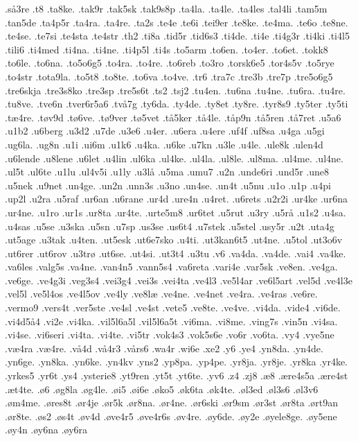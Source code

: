 {.så3re
.t8
.ta8ke.
.tak9r
.tak5sk
.tak9s8p
.ta4la.
.ta4le.
.ta4les
.tal4li
.tam5m
.tan5de
.ta4p5r
.ta4ra.
.ta4re.
.ta2s
.te4e
.te6i
.tei9er
.te8ke.
.te4ma.
.te6o
.te8ne.
.te4se.
.te7si
.te4sta
.te4str
.th2
.ti8a
.tid5r
.tid6s3
.ti4de.
.ti4e
.ti4g3r
.ti4ki
.ti4l5
.tili6
.ti4med
.ti4na.
.ti4ne.
.ti4p5l
.ti4s
.to5arm
.to6en.
.to4er.
.to6et.
.tokk8
.to6le.
.to6na.
.to5o6g5
.to4ra.
.to4re.
.to6reb
.to3ro
.torsk6e5
.tor4s5v
.to5rye
.to4str
.tota9la.
.to5t8
.to8te.
.to6va
.to4ve.
.tr6
.tra7c
.tre3b
.tre7p
.tre5o6g5
.tre6skja
.tre3s8ko
.tre3sp
.tre5s6t
.ts2
.tsj2
.tu4en.
.tu6na
.tu4ne.
.tu6ra.
.tu4re.
.tu8ve.
.tve6n
.tver6r5a6
.två7g
.ty6da.
.ty4de.
.ty8et
.ty8re.
.tyr8s9
.ty5ter
.ty5ti
.tæ4re.
.tøv9d
.tø6ve.
.tø9ver
.tø5vet
.tå5ker
.tå4le.
.tåp9n
.tå5ren
.tå7ret
.u5a6
.u1b2
.u6berg
.u3d2
.u7de
.u3e6
.u4er.
.u6era
.u4ere
.uf4f
.uf8sa
.u4ga
.u5gi
.ug6la.
.ug8n
.u1i
.ui6m
.u1k6
.u4ka.
.u6ke
.u7kn
.u3le
.u4le.
.ule8k
.ulen4d
.u6lende
.u8lene
.u6let
.u4lin
.ul6ka
.ul4ke.
.ul4la.
.ul8le.
.ul8ma.
.ul4me.
.ul4ne.
.ul5t
.ul6te
.u1lu
.ul4v5i
.u1ly
.u3lå
.u5ma
.umu7
.u2n
.unde6ri
.und5r
.une8
.u5nek
.u9net
.un4ge.
.un2n
.unn3s
.u3no
.un4se.
.un4t
.u5nu
.u1o
.u1p
.u4pi
.up2l
.u2ra
.u5raf
.ur6an
.u6rane
.ur4d
.ure4n
.u4ret.
.u6rets
.u2r2i
.ur4ke
.ur6na
.ur4ne.
.u1ro
.ur1s
.ur8ta
.ur4te.
.urte5m8
.ur6tet
.u5rut
.u3ry
.u5rå
.u1s2
.u4sa.
.u4sas
.u5se
.u3ska
.u5sn
.u7sp
.us3se
.us6t4
.u7stek
.u5stel
.usy5r
.u2t
.uta4g
.ut5age
.u3tak
.u4ten.
.ut5esk
.ut6e7sko
.u4ti.
.ut3kan6t5
.ut4ne.
.u5tol
.ut3o6v
.ut6rer
.ut6rov
.u3trø
.ut6se.
.ut4si.
.ut3t4
.u3tu
.v6
.va4da.
.va4de.
.vai4
.va4ke.
.va6les
.valg5s
.va4ne.
.van4n5
.vann5s4
.va6reta
.vari4e
.var5sk
.ve8en.
.ve4ga.
.ve6ge.
.ve4g3i
.veg3s4
.vei3g4
.vei3s
.vei4ta
.ve4l3
.ve5l4ar
.ve6l5art
.vel5d
.ve4l3e
.vel5l
.ve5l4os
.ve4l5ov
.ve4ly
.ve8læ
.ve4ne.
.ve4net
.ve4ra.
.ve4ras
.ve6re.
.vermo9
.vers4t
.ver5ste
.ve4sl
.ve4st
.vete5
.ve8te.
.ve4ve.
.vi4da.
.vide4
.vi6de.
.vi4d5å4
.vi2e
.vi4ka.
.vil5l6a5l
.vil5l6a5t
.vi6ma.
.vi8me.
.ving7s
.vin5n
.vi4sa.
.vi4se.
.vi6seri
.vi4ta.
.vi4te.
.vi5tr
.vok4s3
.vok5s6e
.vo6r
.vo6ta.
.vy4
.vye5ne
.væ4ra
.væ4re.
.vå4d
.vå4r3
.vårs6
.wa4r
.wi6e
.xe2
.y6
.ye4
.yn8da.
.yn4de.
.yn6ge.
.yn8ka.
.yn6ke.
.yn4kv
.yns2
.yp8pa.
.yp4pe.
.yr8ja.
.yr8je.
.yr8ka
.yr4ke.
.yrkes5
.yr6t
.ys4
.ysterie8
.yt9ren
.yt5t
.yt6te.
.yv6
.z4
.zj8
.æ8
.ære4s5a
.ære4st
.æt4te.
.ø6
.øg8la
.øg4le.
.øi5
.øi6e
.øko5
.øk6ta
.øk4te.
.øl3ed
.øl3s6
.øl3v6
.øm4me.
.øres8t
.ør4je
.ør5k
.ør8na.
.ør4ne.
.ør6ski
.ør9sm
.ør3st
.ør8ta
.ørt9an
.ør8te.
.øs2
.øs4t
.øv4d
.øve4r5
.øve4r6s
.øv4re.
.øy6de.
.øy2e
.øyele8ge.
.øy5ene
.øy4n
.øy6na
.øy6ra
}
